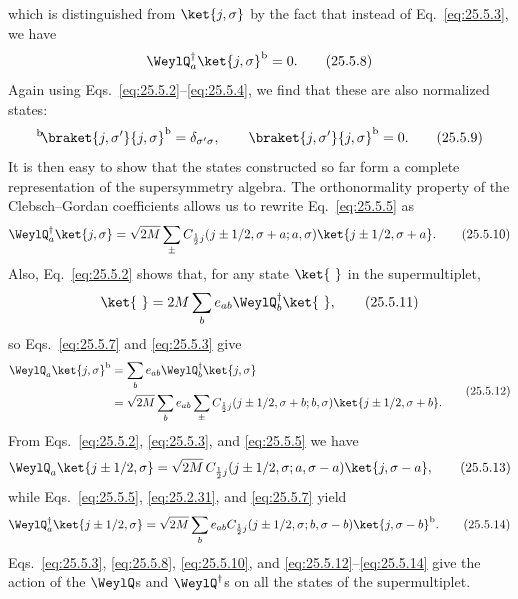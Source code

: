 which is distinguished from $\ket{j,\sigma}$ by the fact that instead of
Eq.~\eqref{eq:25.5.3}, we have
\begin{equation}
 \WeylQ_a^\dagger\ket{j,\sigma}^{\mathrm b}=0.
\tag{25.5.8}\label{eq:25.5.8}
\end{equation}
Again using Eqs.~\eqref{eq:25.5.2}--\eqref{eq:25.5.4}, we find that these are
also normalized states:
\begin{equation}
 {}^{\mathrm b}\!\braket{j,\sigma'}{j,\sigma}^{\mathrm b}
 =\delta_{\sigma'\sigma},
 \qquad
 \braket{j,\sigma'}{j,\sigma}^{\mathrm b}=0.
\tag{25.5.9}\label{eq:25.5.9}
\end{equation}
It is then easy to show that the states constructed so far form a complete
representation of the supersymmetry algebra. The orthonormality property of
the Clebsch--Gordan coefficients allows us to rewrite Eq.~\eqref{eq:25.5.5}
as
\begin{equation}
 \WeylQ_a^\dagger\ket{j,\sigma}
 =\sqrt{2M}\sum_{\pm}
 C_{\frac12 j}(j\pm1/2,\sigma+a;a,\sigma)
 \ket{j\pm1/2,\sigma+a}.
\tag{25.5.10}\label{eq:25.5.10}
\end{equation}
Also, Eq.~\eqref{eq:25.5.2} shows that, for any state $\ket{\ }$ in the
supermultiplet,
\begin{equation}
 [\WeylQ_a,\WeylQ_{1/2}^\dagger\WeylQ_{-1/2}^\dagger]\ket{\ }
 =2M\sum_b e_{ab}\WeylQ_b^\dagger\ket{\ },
\tag{25.5.11}\label{eq:25.5.11}
\end{equation}
so Eqs.~\eqref{eq:25.5.7} and \eqref{eq:25.5.3} give
\begin{equation}
\begin{aligned}
 \WeylQ_a\ket{j,\sigma}^{\mathrm b}
 &=\sum_b e_{ab}\WeylQ_b^\dagger\ket{j,\sigma}
 \\
 &=\sqrt{2M}\sum_b e_{ab}\sum_{\pm}
 C_{\frac12 j}(j\pm1/2,\sigma+b;b,\sigma)
 \ket{j\pm1/2,\sigma+b}.
\end{aligned}
\tag{25.5.12}\label{eq:25.5.12}
\end{equation}
From Eqs.~\eqref{eq:25.5.2}, \eqref{eq:25.5.3}, and \eqref{eq:25.5.5} we
have
\begin{equation}
 \WeylQ_a\ket{j\pm1/2,\sigma}
 =\sqrt{2M}\,
 C_{\frac12 j}(j\pm1/2,\sigma;a,\sigma-a)
 \ket{j,\sigma-a},
\tag{25.5.13}\label{eq:25.5.13}
\end{equation}
while Eqs.~\eqref{eq:25.5.5}, \eqref{eq:25.2.31}, and
\eqref{eq:25.5.7} yield
\begin{equation}
 \WeylQ_a^\dagger\ket{j\pm1/2,\sigma}
 =\sqrt{2M}\sum_b e_{ab}
 C_{\frac12 j}(j\pm1/2,\sigma;b,\sigma-b)
 \ket{j,\sigma-b}^{\mathrm b}.
\tag{25.5.14}\label{eq:25.5.14}
\end{equation}
Eqs.~\eqref{eq:25.5.3}, \eqref{eq:25.5.8}, \eqref{eq:25.5.10}, and
\eqref{eq:25.5.12}--\eqref{eq:25.5.14} give the action of the $\WeylQ$s and
$\WeylQ^\dagger$s on all the states of the supermultiplet.

